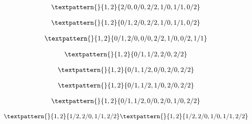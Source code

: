 \begin{equation}
	\begin{gathered}
		\textpattern{}{1,2}{2/0,0/0,2/2,1/0,1/1,0/2}
	\end{gathered}
	\label{cls:126}
\end{equation}

\begin{equation}
	\begin{gathered}
		\textpattern{}{1,2}{0/1,2/0,2/2,1/0,1/1,0/2}
	\end{gathered}
	\label{cls:127}
\end{equation}

\begin{equation}
	\begin{gathered}
		\textpattern{}{1,2}{0/1,2/0,0/0,2/2,1/0,0/2,1/1}
	\end{gathered}
	\label{cls:128}
\end{equation}

\begin{equation}
	\begin{gathered}
		\textpattern{}{1,2}{0/1,1/2,2/0,2/2}
	\end{gathered}
	\label{cls:129}
\end{equation}

\begin{equation}
	\begin{gathered}
		\textpattern{}{1,2}{0/1,1/2,0/0,2/0,2/2}
	\end{gathered}
	\label{cls:130}
\end{equation}

\begin{equation}
	\begin{gathered}
		\textpattern{}{1,2}{0/1,1/2,1/0,2/0,2/2}
	\end{gathered}
	\label{cls:131}
\end{equation}

\begin{equation}
	\begin{gathered}
		\textpattern{}{1,2}{0/1,1/2,0/0,2/0,1/0,2/2}
	\end{gathered}
	\label{cls:132}
\end{equation}

\begin{equation}
	\begin{gathered}
		\textpattern{}{1,2}{1/2,2/0,1/1,2/2}
		\textpattern{}{1,2}{1/2,2/0,1/0,1/1,2/2}
	\end{gathered}
	\label{cls:133}
\end{equation}

